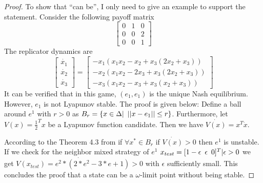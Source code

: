 \documentclass[a4 paper, 12pt]{article}
\begin{document}
\begin{proof}

To show that ``can be'', I only need to give an example to support the statement. Consider the following payoff matrix
\begin{equation}
        \left[
        \begin{array}{ccc}
        0 & 1 & 0 \\
        0 & 0 & 2 \\
        0 & 0 & 1
        \end{array}
        \right]
\end{equation}
The replicator dynamics are
\begin{equation}
        \left[
        \begin{array}{c}
        \dot{x_1} \\
        \dot{x_2} \\
        \dot{x_3} 
        \end{array}
        \right]
        =
        \left[
        \begin{array}{c}
        -x_1(x_1x_2 - x_2 + x_3(2x_2 + x_3))\\
        -x_2(x_1x_2 - 2x_3 + x_3(2x_2 + x_3))\\
        -x_3(x_1x_2 - x_3 + x_3(x_2 + x_3))
        \end{array}
        \right]
\end{equation}
It can be verified that in this game, $(e_1,e_1)$ is the unique Nash equilibrium. However, $e_1$ is not Lyapunov stable. The proof is given below: Define a ball around $e^1$ with $r>0$ as $B_r=\{x\in \Delta | \hspace{0.5em}||x-e_1|| \le r\}$. Furthermore, let $V(x)=\frac{1}{2}^Tx$ be a Lyapunov function candidate. Then we have $\dot{V(x)}=x^T\dot{x}$. 

According to the Theorem 4.3 from  if $\forall x^* \in B_r$ if $\dot{V(x)}>0$ then $e^1$ is unstable. If we check for the neighbor mixed strategy of $e^1$ $x_{test}=[1-\epsilon \hspace{0.5em} \epsilon \hspace{0.5em}0]^T | \epsilon >0$ we get $\dot{V(x_{test})=
e^2*(2*e^2 - 3*e + 1)>0}$ with $\epsilon$ sufficiently small. This concludes the proof that a state can be a $\omega$-limit point without being stable.


\end{proof}
\end{document}
